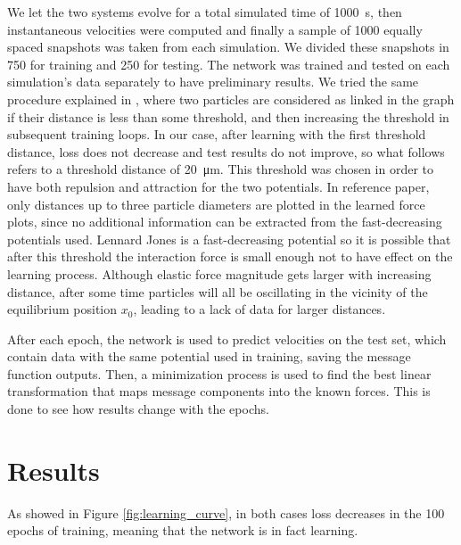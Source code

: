 \documentclass[../../master_thesis_np.tex]{subfiles}
\begin{document}
We let the two systems evolve for a total simulated time of \SI{1000}{\second}, then instantaneous velocities were computed and finally a sample of \num{1000} equally spaced snapshots was taken from each simulation.
We divided these snapshots in \num{750} for training and \num{250} for testing.
The network was trained and tested on each simulation's data separately to have preliminary results.
We tried the same procedure explained in \cite{ruiz-garcia_discovering_2024}, where two particles are considered as linked in the graph if their distance is less than some threshold, and then increasing the threshold in subsequent training loops.
In our case, after learning with the first threshold distance, loss does not decrease and test results do not improve, so what follows refers to a threshold distance of \SI{20}{\um}.
This threshold was chosen in order to have both repulsion and attraction for the two potentials.
In reference paper, only distances up to three particle diameters are plotted in the learned force plots, since no additional information can be extracted from the fast-decreasing potentials \citeauthor{ruiz-garcia_discovering_2024} used.
Lennard Jones is a fast-decreasing potential so it is possible that after this threshold the interaction force is small enough not to have effect on the learning process.
Although elastic force magnitude gets larger with increasing distance, after some time particles will all be oscillating in the vicinity of the equilibrium position $x_0$, leading to a lack of data for larger distances.

After each epoch, the network is used to predict velocities on the test set, which contain data with the same potential used in training, saving the message function outputs.
Then, a minimization process is used to find the best linear transformation that maps message components into the known forces.
This is done to see how results change with the epochs.

\section{Results} \label{4results}
As showed in Figure \ref{fig:learning_curve}, in both cases loss decreases in the 100 epochs of training, meaning that the network is in fact learning.
\end{document}
